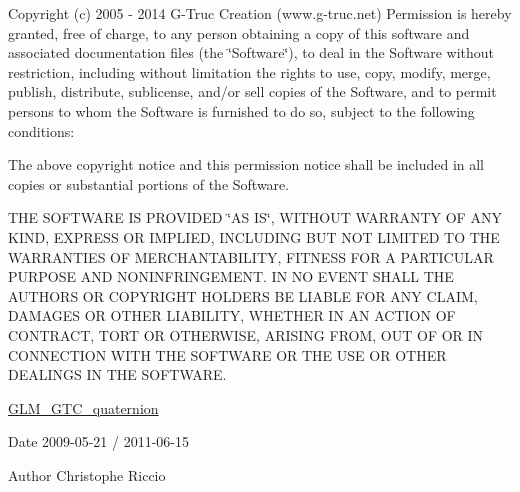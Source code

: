 Copyright (c) 2005 -\/ 2014 G-\/\+Truc Creation (www.\+g-\/truc.\+net) Permission is hereby granted, free of charge, to any person obtaining a copy of this software and associated documentation files (the \char`\"{}\+Software\char`\"{}), to deal in the Software without restriction, including without limitation the rights to use, copy, modify, merge, publish, distribute, sublicense, and/or sell copies of the Software, and to permit persons to whom the Software is furnished to do so, subject to the following conditions\+:

The above copyright notice and this permission notice shall be included in all copies or substantial portions of the Software.

T\+HE S\+O\+F\+T\+W\+A\+RE IS P\+R\+O\+V\+I\+D\+ED \char`\"{}\+A\+S I\+S\char`\"{}, W\+I\+T\+H\+O\+UT W\+A\+R\+R\+A\+N\+TY OF A\+NY K\+I\+ND, E\+X\+P\+R\+E\+SS OR I\+M\+P\+L\+I\+ED, I\+N\+C\+L\+U\+D\+I\+NG B\+UT N\+OT L\+I\+M\+I\+T\+ED TO T\+HE W\+A\+R\+R\+A\+N\+T\+I\+ES OF M\+E\+R\+C\+H\+A\+N\+T\+A\+B\+I\+L\+I\+TY, F\+I\+T\+N\+E\+SS F\+OR A P\+A\+R\+T\+I\+C\+U\+L\+AR P\+U\+R\+P\+O\+SE A\+ND N\+O\+N\+I\+N\+F\+R\+I\+N\+G\+E\+M\+E\+NT. IN NO E\+V\+E\+NT S\+H\+A\+LL T\+HE A\+U\+T\+H\+O\+RS OR C\+O\+P\+Y\+R\+I\+G\+HT H\+O\+L\+D\+E\+RS BE L\+I\+A\+B\+LE F\+OR A\+NY C\+L\+A\+IM, D\+A\+M\+A\+G\+ES OR O\+T\+H\+ER L\+I\+A\+B\+I\+L\+I\+TY, W\+H\+E\+T\+H\+ER IN AN A\+C\+T\+I\+ON OF C\+O\+N\+T\+R\+A\+CT, T\+O\+RT OR O\+T\+H\+E\+R\+W\+I\+SE, A\+R\+I\+S\+I\+NG F\+R\+OM, O\+UT OF OR IN C\+O\+N\+N\+E\+C\+T\+I\+ON W\+I\+TH T\+HE S\+O\+F\+T\+W\+A\+RE OR T\+HE U\+SE OR O\+T\+H\+ER D\+E\+A\+L\+I\+N\+GS IN T\+HE S\+O\+F\+T\+W\+A\+RE.

\hyperlink{group__gtc__quaternion}{G\+L\+M\+\_\+\+G\+T\+C\+\_\+quaternion}

\begin{DoxyDate}{Date}
2009-\/05-\/21 / 2011-\/06-\/15 
\end{DoxyDate}
\begin{DoxyAuthor}{Author}
Christophe Riccio 
\end{DoxyAuthor}
